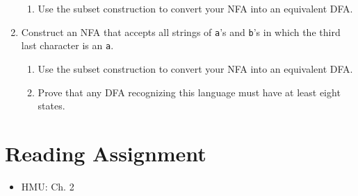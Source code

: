 \documentclass[]{article}
\begin{document}
\begin{enumerate}
\begin{enumerate}
        \item Use the subset construction to convert your NFA into an equivalent
         DFA.
      \end{enumerate}
    \item Construct an NFA that accepts all strings of \texttt{a}'s and 
    \texttt{b}'s in which the third last character is an \texttt{a}.
      \begin{enumerate}
        \item Use the subset construction to convert your NFA into an equivalent
         DFA.
        \item Prove that any DFA recognizing this language must have at least 
        eight states.
      \end{enumerate}
  \end{enumerate}
  
\section{Reading Assignment}
  \begin{itemize}
    \item HMU: Ch. 2
  \end{itemize}
\end{document}
